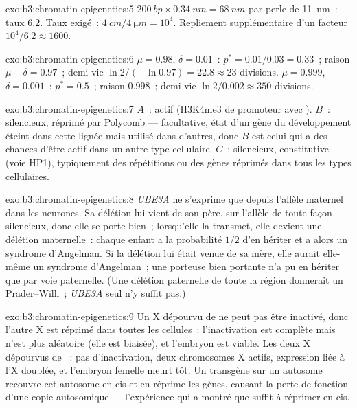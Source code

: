 \begin{solution}{exo:b3:chromatin-epigenetics:5}
$\qty{200}{bp}\times \qty{0.34}{nm} = \qty{68}{nm}$ par perle de
\qty{11}{nm}~: taux $6.2$. Taux exigé~: $\qty{4}{cm}/\qty{4}{\micro m} =
10^{4}$. Repliement supplémentaire d'un facteur $10^{4}/6.2 \approx 1600$.
\end{solution}

\begin{solution}{exo:b3:chromatin-epigenetics:6}
$\mu = 0.98$, $\delta = 0.01$~: $p^{*} = 0.01/0.03 = 0.33$~; raison $\mu -
\delta = 0.97$~; demi-vie $\ln 2/(-\ln 0.97) = 22.8 \approx 23$
divisions. $\mu = 0.999$, $\delta = 0.001$~: $p^{*} = 0.5$~; raison
$0.998$~; demi-vie $\ln 2 / 0.002 \approx 350$ divisions.
\end{solution}

\begin{solution}{exo:b3:chromatin-epigenetics:7}
$A$~: actif (H3K4me3 de promoteur avec ). $B$~: silencieux,
réprimé par Polycomb ---  facultative, état d'un gène
du développement éteint dans cette lignée mais utilisé dans d'autres,
donc $B$ est celui qui a des chances d'être actif dans un autre type
cellulaire. $C$~: silencieux,  constitutive (voie HP1),
typiquement des répétitions ou des gènes réprimés dans tous les types
cellulaires.
\end{solution}

\begin{solution}{exo:b3:chromatin-epigenetics:8}
\emph{UBE3A} ne s'exprime que depuis l'allèle maternel dans les
neurones. Sa délétion lui vient de son père, sur l'allèle de toute
façon silencieux, donc elle se porte bien~; lorsqu'elle la transmet,
elle devient une délétion maternelle~: chaque enfant a la probabilité
$1/2$ d'en hériter et a alors un syndrome d'Angelman. Si la délétion
lui était venue de sa mère, elle aurait elle-même un syndrome
d'Angelman~; une porteuse bien portante n'a pu en hériter que par voie
paternelle. (Une délétion paternelle de toute la région donnerait un
Prader--Willi~; \emph{UBE3A} seul n'y suffit pas.)
\end{solution}

\begin{solution}{exo:b3:chromatin-epigenetics:9}
Un X dépourvu de \emph{} ne peut pas être inactivé, donc l'autre X
est réprimé dans toutes les cellules~: l'inactivation est complète mais
n'est plus aléatoire (elle est biaisée), et l'embryon est viable. Les
deux X dépourvus de \emph{}~: pas d'inactivation, deux chromosomes
X actifs, expression liée à l'X doublée, et l'embryon femelle meurt
tôt. Un transgène \emph{} sur un autosome recouvre cet autosome en
cis et en réprime les gènes, causant la perte de fonction d'une copie
autosomique --- l'expérience qui a montré que \emph{} suffit à
réprimer en cis.
\end{solution}

